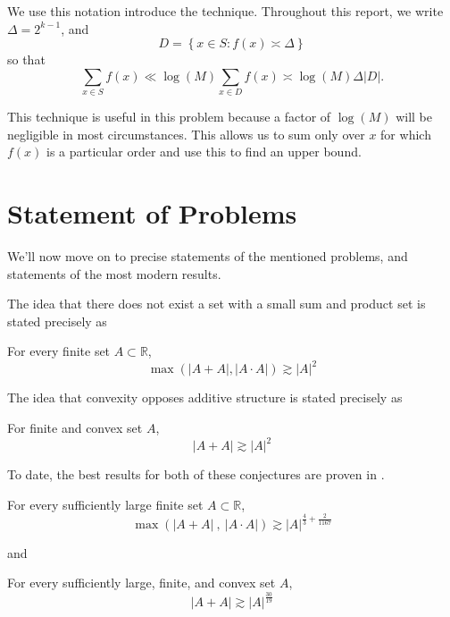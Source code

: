 \documentclass[12pt,reqno]{amsart}
\begin{document}
We use this notation introduce the technique. Throughout this report, we write
\(\Delta= 2^{k-1}\), and
\[
    D =\left\{ x \in S : f(x) \asymp \Delta\right\} 
\]
so that
\[
    \sum _{x \in S} f(x) \ll \log \left( M \right) \sum _{x \in D} f(x)\asymp \log \left( M \right) \Delta \left\lvert D \right\rvert 
.\]

This technique is useful in this problem because a factor of \(\log \left( M \right) \) will
be negligible in most circumstances. This allows us to sum only over \(x\) for which \(f(x)\) is
a particular order and use this to find an upper bound.




\section{Statement of Problems}

We'll now move on to precise statements of the mentioned problems, and statements of the most modern results.

The idea that there does not exist a set with a small sum and product set is
stated precisely as
\begin{conjecture}
For every finite set \(A \subset \mathbb{R} \),
\[
    \max \left( \left\lvert A+A \right\rvert, \left\lvert A \cdot A \right\rvert  \right) \gtrsim   \left\lvert A \right\rvert^{2}
\]
\end{conjecture}

The idea that convexity opposes additive structure is stated precisely as

\begin{conjecture}
    For finite and convex set \(A\),
    \[
        \left\lvert A+A \right\rvert \gtrsim   \left\lvert A \right\rvert ^{2}
    \]
\end{conjecture}

To date, the best results for both of these conjectures are proven in \cite{stevens-rudnev}.
\begin{theorem}
    For every sufficiently large finite set \(A \subset \mathbb{R} \),
    \[
        \max \left( \left\lvert A+A \right\rvert ~,~ \left\lvert A \cdot A \right\rvert  \right) \gtrsim    \left\lvert A \right\rvert^{\frac{4}{3} + \frac{2}{1167}}
    \]
\end{theorem}
and
\begin{theorem}
    For every sufficiently large, finite, and convex set \(A\),
    \[
        \left\lvert A+A \right\rvert \gtrsim   \left\lvert A \right\rvert ^{\frac{30}{19} }
    \]
\end{theorem}
\end{document}
